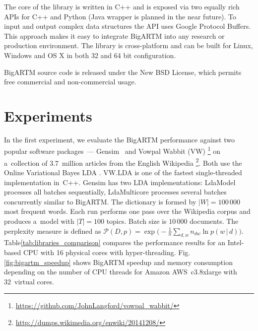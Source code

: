 \documentclass[russian,english]{llncs}
\newcommand{\cond}{\mspace{3mu}{|}\mspace{3mu}}
\newcommand{\kw}[1]{\textsf{#1}}
\begin{document}

The core of the library is written in C++ and is exposed via two equally rich APIs for C++ and Python
(Java wrapper is planned in the near future).
To input and output complex data structures the API uses Google Protocol Buffers.
This approach makes it easy to integrate BigARTM into any research or production environment.
The library is cross-platform and can be built for Linux, Windows and OS X in both 32 and 64 bit configuration.

BigARTM source code is released under the New BSD License, which permits free commercial and non-commercial usage.

\section{Experiments}
\label{sec:Experiments}

In the first experiment, 
we evaluate the \mbox{BigARTM} performance against two popular software packages~---
Gensim~\cite{rehurek10software}
and Vowpal Wabbit (VW)%
\footnote{\url{https://github.com/JohnLangford/vowpal_wabbit/}}
on a~collection of 3.7~million articles from the English Wikipedia%
\footnote{\url{http://dumps.wikimedia.org/enwiki/20141208/}}.
Both use the Online Variational Bayes LDA \cite{hoffman10online}.
\mbox{VW.LDA} is one of the fastest single-threaded implementation in~C++.
Gensim has two LDA implementations:
LdaModel processes all batches sequentially,
LdaMulticore processes several batches concurrently similar to \mbox{BigARTM}.
The dictionary is formed by $|W| = 100\,000$ most frequent words.
Each run performs one pass over the Wikipedia corpus and produces a~model with $|T|=100$ topics.
Batch size is $10\,000$ documents.
The perplexity measure is defined as
$\mathcal{P}(D, p) = \exp \bigl( - \frac{1}{n} \sum_{d,w} n_{dw} \ln p(w \cond d) \bigr)$.
Table\;\ref{tab:libraries_comparison} compares the performance results
for an Intel-based CPU with 16 physical cores with hyper-threading.
Fig.\;\ref{fig:bigartm_speedup} shows BigARTM speedup and memory consumption depending on the number of CPU threads
for Amazon AWS~c3.8xlarge with 32~virtual cores.
\end{document}
